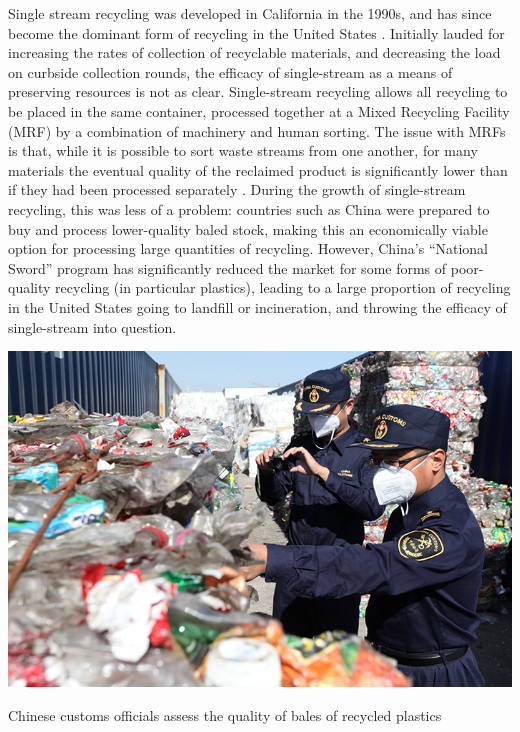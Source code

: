 \documentclass[nofonts,nols,justified,nobib]{tufte-book}
\begin{document}
Single stream recycling was developed in California in the 1990s, and has since become the dominant form of recycling in the United States \cite{laskow_single-stream_2014}. Initially lauded for increasing the rates of collection of recyclable materials, and decreasing the load on curbside collection rounds, the efficacy of single-stream as a means of preserving resources is not as clear. Single-stream recycling allows all recycling to be placed in the same container, processed together at a Mixed Recycling Facility (MRF) by a combination of machinery and human sorting. The issue with MRFs is that, while it is possible to sort waste streams from one another, for many materials the eventual quality of the reclaimed product is significantly lower than if they had been processed separately \cite{morawski_understanding_2009}. During the growth of single-stream recycling, this was less of a problem: countries such as China were prepared to buy and process lower-quality baled stock, making this an economically viable option for processing large quantities of recycling. However, China's ``National Sword'' program has significantly reduced the market for some forms of poor-quality recycling (in particular plastics), leading to a large proportion of recycling in the United States going to landfill or incineration, and throwing the efficacy of single-stream into question.

\begin{marginfigure}
\includegraphics[width=\textwidth]{img/1/china-recycling-inspection.jpg}
\caption{Chinese customs officials assess the quality of bales of recycled plastics\label{b} \cite{martin_reverberations_2017}}
\end{marginfigure}
\end{document}
